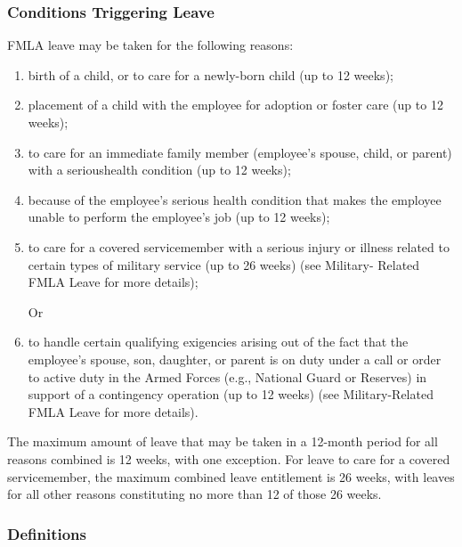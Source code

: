 \documentclass{book}
\begin{document}
\subsubsection{Conditions Triggering Leave}

FMLA leave may be taken for the following reasons:

\begin{enumerate} \item birth of a child, or to care for a newly-born child (up to 12 weeks);

\item placement of a child with the employee for adoption or foster care (up to 12 weeks);

\item to care for an immediate family member (employee's spouse, child, or parent) with a serioushealth condition (up to 12 weeks);

\item because of the employee's serious health condition that makes the employee unable to perform the employee's job (up to 12 weeks);

\item to care for a covered servicemember with a serious injury or illness related to certain types of military service (up to 26 weeks) (see Military- Related FMLA Leave for more details);

Or

\item to handle certain qualifying exigencies arising out of the fact that the employee's spouse, son, daughter, or parent is on duty under a call or order to active duty in the Armed Forces (e.g., National Guard or Reserves) in support of a contingency operation (up to 12 weeks) (see Military-Related FMLA Leave for more details). \end{enumerate}

The maximum amount of leave that may be taken in a 12-month period for all reasons combined is 12 weeks, with one exception. For leave to care for a covered servicemember, the maximum combined leave entitlement is 26 weeks, with leaves for all other reasons constituting no more than 12 of those 26 weeks.

\subsubsection{Definitions}
\end{document}
